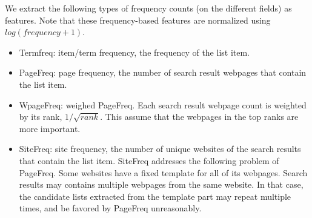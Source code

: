 We extract the following types of frequency counts (on the different fields) as features. Note that these frequency-based features are normalized using $log(frequency+1)$.
\begin{itemize}
 \item Termfreq: item/term frequency, the frequency of the list item.
 \item PageFreq: page frequency, the number of search result webpages that contain the list item.
 \item WpageFreq: weighed PageFreq. Each search result webpage count is weighted by its rank, $1/\sqrt{rank}$. This assume that the webpages in the top ranks are more important.
 \item SiteFreq: site frequency, the number of unique websites of the search results that contain the list item. SiteFreq addresses the following problem of PageFreq. Some websites have a fixed template for all of its webpages.  Search results may contains multiple webpages from the same website. In that case, the candidate lists extracted from the template part may repeat multiple times, and be favored by PageFreq unreasonably.  
\end{itemize}

